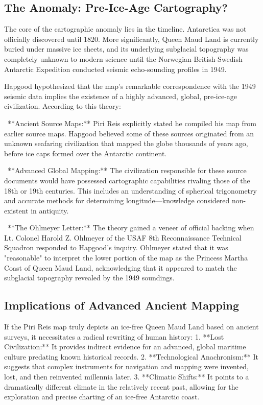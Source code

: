 \documentclass[aps,prd,11pt,onecolumn,superscriptaddress,nofootinbib,floatfix]{revtex4-2}
\begin{document}
\subsection{The Anomaly: Pre-Ice-Age Cartography?}
The core of the cartographic anomaly lies in the timeline. Antarctica was not officially discovered until 1820. More significantly, Queen Maud Land is currently buried under massive ice sheets, and its underlying subglacial topography was completely unknown to modern science until the Norwegian-British-Swedish Antarctic Expedition conducted seismic echo-sounding profiles in 1949.


Hapgood hypothesized that the map's remarkable correspondence with the 1949 seismic data implies the existence of a highly advanced, global, pre-ice-age civilization. According to this theory:


\textbullet~**Ancient Source Maps:** Piri Reis explicitly stated he compiled his map from earlier source maps. Hapgood believed some of these sources originated from an unknown seafaring civilization that mapped the globe thousands of years ago, before ice caps formed over the Antarctic continent.

\textbullet~**Advanced Global Mapping:** The civilization responsible for these source documents would have possessed cartographic capabilities rivaling those of the 18th or 19th centuries. This includes an understanding of spherical trigonometry and accurate methods for determining longitude---knowledge considered non-existent in antiquity.

\textbullet~**The Ohlmeyer Letter:** The theory gained a veneer of official backing when Lt. Colonel Harold Z. Ohlmeyer of the USAF 8th Reconnaissance Technical Squadron responded to Hapgood's inquiry. Ohlmeyer stated that it was "reasonable" to interpret the lower portion of the map as the Princess Martha Coast of Queen Maud Land, acknowledging that it appeared to match the subglacial topography revealed by the 1949 soundings.



\subsection{Implications of Advanced Ancient Mapping}
If the Piri Reis map truly depicts an ice-free Queen Maud Land based on ancient surveys, it necessitates a radical rewriting of human history:
1. **Lost Civilization:** It provides indirect evidence for an advanced, global maritime culture predating known historical records.
2. **Technological Anachronism:** It suggests that complex instruments for navigation and mapping were invented, lost, and then reinvented millennia later.
3. **Climatic Shifts:** It points to a dramatically different climate in the relatively recent past, allowing for the exploration and precise charting of an ice-free Antarctic coast.
\end{document}
